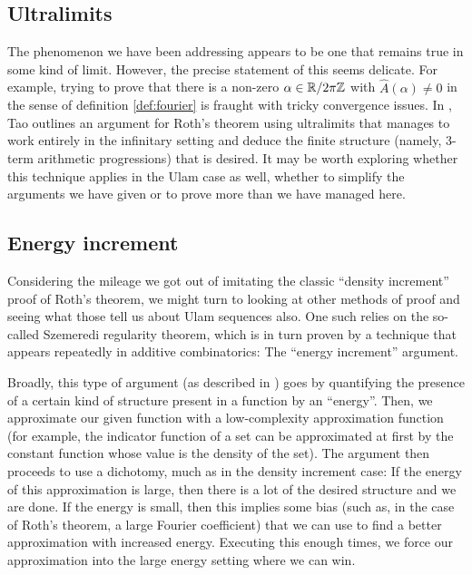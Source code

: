 \documentclass{report}
\theoremstyle{remark}
\numberwithin{equation}{section}
\begin{document}
\subsection{Ultralimits}

The phenomenon we have been addressing appears to be one that remains
true in some kind of limit.  However, the precise statement of this
seems delicate.  For example, trying to prove that there is a non-zero
$\alpha\in\mathbb{R}/2\pi\mathbb{Z}$ with $\widehat{A}(\alpha) \neq 0$ in the sense of
definition \ref{def:fourier} is fraught with tricky convergence
issues.  In \cite{tao:ams2012}, Tao outlines an argument for Roth's
theorem using ultralimits that manages to work entirely in the
infinitary setting and deduce the finite structure (namely, 3-term
arithmetic progressions) that is desired.  It may be worth exploring
whether this technique applies in the Ulam case as well, whether to
simplify the arguments we have given or to prove more than we have
managed here.

\subsection{Energy increment}

Considering the mileage we got out of imitating the classic ``density
increment'' proof of Roth's theorem, we might turn to looking at other
methods of proof and seeing what those tell us about Ulam sequences
also.  One such relies on the so-called Szemeredi regularity theorem,
which is in turn proven by a technique that appears repeatedly in
additive combinatorics: The ``energy increment'' argument.  

Broadly, this type of argument (as described in \cite{tao:cup2006})
goes by quantifying the presence of a certain kind of structure
present in a function by an ``energy''.  Then, we approximate our
given function with a low-complexity approximation function (for
example, the indicator function of a set can be approximated at first
by the constant function whose value is the density of the set).  The
argument then proceeds to use a dichotomy, much as in the density
increment case: If the energy of this approximation is large, then
there is a lot of the desired structure and we are done.  If the
energy is small, then this implies some bias (such as, in the case of
Roth's theorem, a large Fourier coefficient) that we can use to find a
better approximation with increased energy.  Executing this enough
times, we force our approximation into the large energy setting where
we can win.
\end{document}

